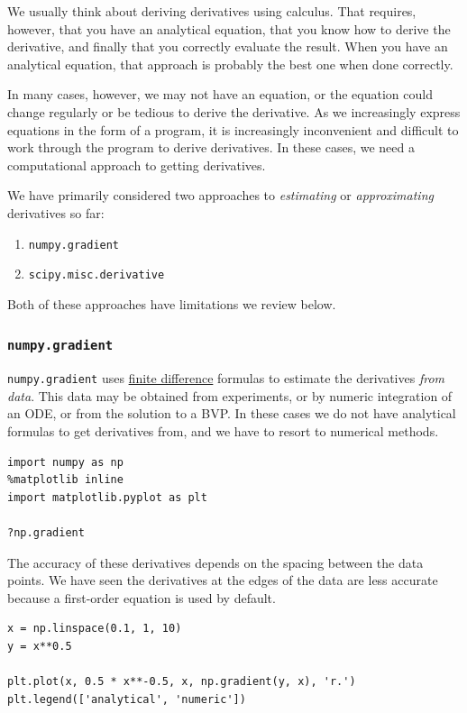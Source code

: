 \documentclass[11pt]{article}
\begin{document}
We usually think about deriving derivatives using calculus. That requires, however, that you have an analytical equation, that you know how to derive the derivative, and finally that you correctly evaluate the result. When you have an analytical equation, that approach is probably the best one when done correctly.

In many cases, however, we may not have an equation, or the equation could change regularly or be tedious to derive the derivative. As we increasingly express equations in the form of a program, it is increasingly inconvenient and difficult to work through the program to derive derivatives. In these cases, we need a computational approach to getting derivatives.

We have primarily considered two approaches to \emph{estimating} or \emph{approximating} derivatives so far:

\begin{enumerate}
\item \texttt{numpy.gradient}
\item \texttt{scipy.misc.derivative}
\end{enumerate}

Both of these approaches have limitations we review below.

\subsubsection{\texttt{numpy.gradient}}
\label{sec:org64ac6a7}

\texttt{numpy.gradient} uses \href{https://en.wikipedia.org/wiki/Numerical\_differentiation}{finite difference} formulas to estimate the derivatives \emph{from data}. This data may be obtained from experiments, or by numeric integration of an ODE, or from the solution to a BVP. In these cases we do not have analytical formulas to get derivatives from, and we have to resort to numerical methods.

\begin{verbatim}
import numpy as np
%matplotlib inline
import matplotlib.pyplot as plt

?np.gradient
\end{verbatim}

The accuracy of these derivatives depends on the spacing between the data points. We have seen the derivatives at the edges of the data are less accurate because a first-order equation is used by default.

\begin{verbatim}
x = np.linspace(0.1, 1, 10)
y = x**0.5

plt.plot(x, 0.5 * x**-0.5, x, np.gradient(y, x), 'r.')
plt.legend(['analytical', 'numeric'])
\end{verbatim}
\end{document}
